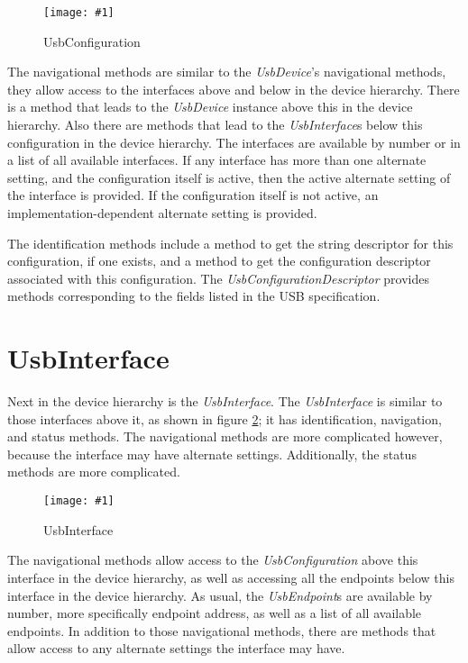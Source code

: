 \documentclass{article}
\newcommand{\myinterface}[1]{\emph{#1}}
\newcommand{\mysectionend}[0]{\vfill\pagebreak[1]}
\newcommand{\myfigure}[3]{\begin{figure}[htbp]\centering\texttt{[image: \#1]}\caption{#2}\label{#3}\end{figure}}
\begin{document}
\myfigure{figs/UsbConfiguration}{UsbConfiguration}{UsbConfiguration}

The navigational methods are similar to the \myinterface{UsbDevice}'s navigational
methods, they allow access to the interfaces above and below in the
device hierarchy.  There is a method that leads to the \myinterface{UsbDevice}
instance above this in the device hierarchy.  Also there are methods
that lead to the \myinterface{UsbInterface}s below this configuration in the device
hierarchy.  The interfaces are available by number or in a list of all
available interfaces.  If any interface has more than one alternate
setting, and the configuration itself is active, then the active
alternate setting of the interface is provided.  If the configuration
itself is not active, an implementation-dependent alternate setting
is provided.

The identification methods include a method to get the string
descriptor for this configuration, if one exists, and a method to get
the configuration descriptor associated with this configuration.  The
\myinterface{UsbConfigurationDescriptor} provides methods corresponding to the fields
listed in the USB specification.

\mysectionend

%

\section{UsbInterface}

Next in the device hierarchy is the \myinterface{UsbInterface}.  The \myinterface{UsbInterface} is
similar to those interfaces above it, as shown in figure \ref{UsbInterface};
it has identification, navigation, and status methods.  The navigational
methods are more complicated however, because the interface may have
alternate settings.  Additionally, the status methods are more complicated.

\myfigure{figs/UsbInterface}{UsbInterface}{UsbInterface}

The navigational methods allow access to the \myinterface{UsbConfiguration} above this
interface in the device hierarchy, as well as accessing all the
endpoints below this interface in the device hierarchy.  As usual, the
\myinterface{UsbEndpoint}s are available by number, more specifically endpoint address,
as well as a list of all available endpoints.  In addition to those
navigational methods, there are methods that allow access to any alternate
settings the interface may have.
\end{document}
